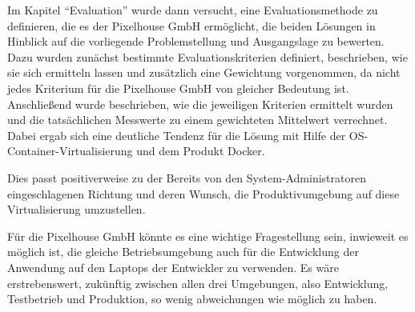 Im Kapitel "`Evaluation"' wurde dann versucht, eine Evaluationsmethode zu definieren, die es der Pixelhouse GmbH ermöglicht, die beiden Lösungen in Hinblick auf die vorliegende Problemstellung und Ausgangslage zu bewerten. Dazu wurden zunächst bestimmte Evaluationskriterien definiert, beschrieben, wie sie sich ermitteln lassen und zusätzlich eine Gewichtung vorgenommen, da nicht jedes Kriterium für die Pixelhouse GmbH von gleicher Bedeutung ist. Anschließend wurde beschrieben, wie die jeweiligen Kriterien ermittelt wurden und die tatsächlichen Messwerte zu einem gewichteten Mittelwert verrechnet. Dabei ergab sich eine deutliche Tendenz für die Lösung mit Hilfe der OS-Container-Virtualisierung und dem Produkt Docker.

Dies passt positiverweise zu der Bereits von den System-Administratoren eingeschlagenen Richtung und deren Wunsch, die Produktivumgebung auf diese Virtualisierung umzustellen.

Für die Pixelhouse GmbH könnte es eine wichtige Fragestellung sein, inwieweit es möglich ist, die gleiche Betriebsumgebung auch für die Entwicklung der Anwendung auf den Laptops der Entwickler zu verwenden. Es wäre erstrebenswert, zukünftig zwischen allen drei Umgebungen, also Entwicklung, Testbetrieb und Produktion, so wenig abweichungen wie möglich zu haben.